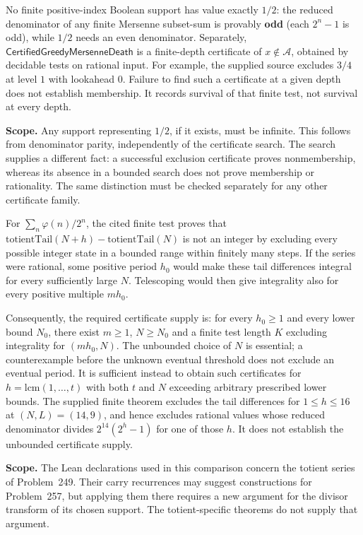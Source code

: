 \begin{prop}
\label{prop:finite-boolSupport-and-onesided}
No finite positive-index Boolean support has value exactly $1/2$: the reduced denominator of any
finite Mersenne subset-sum is provably \textbf{odd} (each $2^n-1$ is odd), while $1/2$ needs an even
denominator. Separately,
$\mathsf{CertifiedGreedyMersenneDeath}$ is a finite-depth certificate
of $x\notin\mathcal A$, obtained by decidable tests on rational input.
For example, the supplied source excludes $3/4$ at level $1$ with
lookahead $0$.
Failure to find such a certificate at a given depth does not establish
membership.  It records survival of that finite test, not survival
at every depth.

\textbf{Scope.} Any support representing $1/2$, if it exists, must
be infinite.  This follows from denominator parity, independently
of the certificate search.  The search supplies a different fact:
a successful exclusion certificate proves nonmembership, whereas
its absence in a bounded search does not prove membership or
rationality.  The same distinction must be checked separately for
any other certificate family.
\end{prop}

\begin{prop}
\label{prop:carry-survivor-extinction}
For $\sum_n\varphi(n)/2^n$, the cited finite test proves that
$\mathrm{totientTail}(N+h)-\mathrm{totientTail}(N)$ is not an integer
by excluding every possible integer state in a bounded range within
finitely many steps.  If the series were rational, some positive
period $h_0$ would make these tail differences integral for every
sufficiently large $N$.  Telescoping would then give integrality
also for every positive multiple $mh_0$.

Consequently, the required certificate supply is: for every $h_0\ge1$
and every lower bound $N_0$, there exist $m\ge1$, $N\ge N_0$ and a
finite test length $K$ excluding integrality for $(mh_0,N)$.  The
unbounded choice of $N$ is essential; a counterexample before the
unknown eventual threshold does not exclude an eventual period.
It is sufficient instead to obtain such certificates for
$h=\mathrm{lcm}(1,\ldots,t)$ with both $t$ and $N$ exceeding arbitrary
prescribed lower bounds.
The supplied finite theorem excludes the tail differences for
$1\le h\le16$ at $(N,L)=(14,9)$, and hence excludes rational values
whose reduced denominator divides $2^{14}(2^h-1)$ for one of those
$h$.  It does not establish the unbounded certificate supply.

\textbf{Scope.} The Lean declarations used in this comparison
concern the totient series of Problem~249.  Their carry recurrences
may suggest constructions for Problem~257, but applying them there
requires a new argument for the divisor transform of its chosen
support.  The totient-specific theorems do not supply that argument.
\end{prop}

